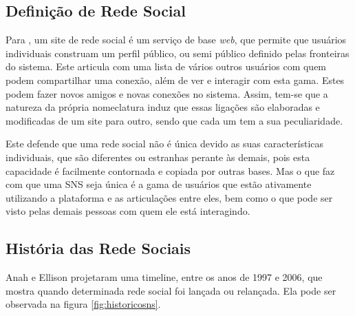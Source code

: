 \subsection{Definição de Rede Social}


\label{sec:definicao}
Para \cite{socialnetworkdefinition}, um site de rede social é um serviço
de base \textit{web}, que permite que usuários individuais construam um perfil público, ou
semi público definido pelas fronteiras do sistema. Este articula com uma lista de
vários outros usuários com quem podem compartilhar uma conexão, além de ver e
interagir com esta gama. Estes podem fazer novos amigos e novas conexões no sistema.
Assim, tem-se que a natureza da própria nomeclatura induz que essas ligações
são elaboradas e modificadas de um site para outro, sendo que cada um tem a sua
peculiaridade.

Este defende que uma rede social não é única devido as suas características individuais,
que são diferentes ou estranhas perante às demais, pois esta capacidade é facilmente
contornada e copiada por outras bases. Mas o que faz com que uma SNS seja única
é a gama de usuários que estão ativamente utilizando a plataforma e as articulações
entre eles, bem como o que pode ser visto pelas demais pessoas com quem ele está
interagindo.

\subsection{História das Rede Sociais}
\label{sec:historiadasredessociais}
Anah e Ellison projetaram uma timeline, entre os anos de 1997 e 2006, que mostra
quando determinada rede social foi lançada ou relançada. Ela pode ser observada
na figura \ref{fig:historicosns}.

